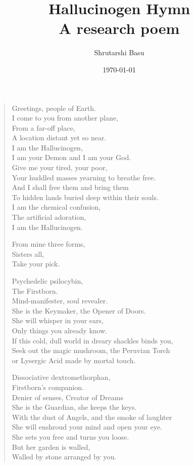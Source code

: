 \documentclass[11pt,letterpaper]{article}
\title{Hallucinogen Hymn\\ A research poem}
\author{Shrutarshi Basu}
\date{\today}
\begin{document}
\maketitle
\begin{verse}
Greetings, people of Earth.\\
I come to you from another plane,\\
From a far-off place,\\
A location distant yet so near.\\
I am the Hallucinogen,\\
I am your Demon and I am your God.\\
Give me your tired, your poor,\\
Your huddled masses yearning to breathe free.\\
And I shall free them and bring them\\
To hidden lands buried deep within their souls.\\
I am the chemical confusion,\\
The artificial adoration,\\
I am the Hallucinogen.

From mine three forms,\\
Sisters all,\\
Take your pick.

Psychedelic psilocybin,\\
The Firstborn.\\
Mind-manifester, soul revealer.\\
She is the Keymaker, the Opener of Doors.\\
She will whisper in your ears,\\
Only things you already know.\\
If this cold, dull world in dreary shackles binds you,\\
Seek out the magic mushroom, the Peruvian Torch\\
or Lysergic Acid made by mortal touch.

Dissociative dextromethorphan,\\
Firstborn's companion.\\
Denier of senses, Creator of Dreams\\
She is the Guardian, she keeps the keys.\\
With the dust of Angels, and the smoke of laughter\\
She will enshroud your mind and open your eye.\\
She sets you free and turns you loose.\\
But her garden is walled,\\
Walled by stone arranged by you.


\end{verse}
\end{document}

